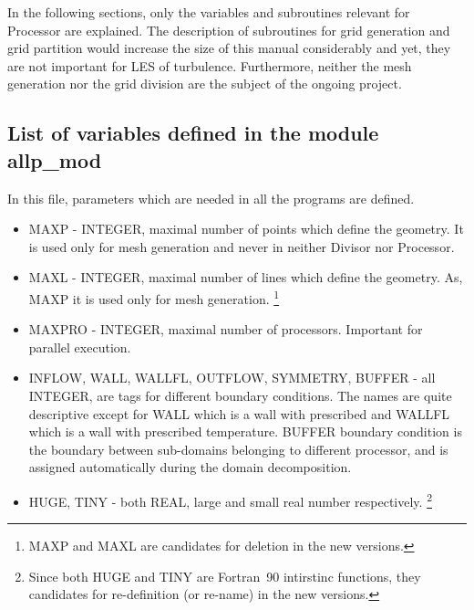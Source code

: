 \documentclass[10pt]{article}
\newcommand*{\tc}{\ttfamily} %
\newcommand*{\tn}{\sffamily} %
\begin{document}
    In the following sections, only the variables and subroutines
    relevant for {\tn Processor} are explained. The description of 
    subroutines for grid generation and grid partition would 
    increase the size of this manual considerably and yet, they
    are not important for LES of turbulence. Furthermore, neither
    the mesh generation nor the grid division are the subject of
    the ongoing project.

    \subsection{List of variables defined in the module {\tc allp\_mod}}

    In this file, parameters which are needed in all the programs
    are defined.

    \begin{itemize}

    \item
    {\tc MAXP} - INTEGER, maximal number of points which define the geometry.
      It is used only for mesh generation and never in neither {\tn Divisor}
      nor {\tn Processor}. 

    \item
    {\tc MAXL} - INTEGER, maximal number of lines which define the geometry.
      As, {\tc MAXP} it is used only for mesh generation.
    \footnote{{\tc MAXP} and {\tc MAXL} are candidates for deletion in
     the new versions.} 

    \item
    {\tc MAXPRO} - INTEGER, maximal number of processors. Important for
      parallel execution.

    \item
    {\tc INFLOW, WALL, WALLFL, OUTFLOW, SYMMETRY, BUFFER} - all INTEGER, are 
      tags for different boundary conditions. The names are quite 
      descriptive except for {\tc WALL} which is a wall with prescribed
      and {\tc WALLFL} which is a wall with prescribed temperature.  
      BUFFER boundary condition is the boundary between
      sub-domains belonging to different processor, and is assigned
      automatically during the domain decomposition.

    \item
    {\tc HUGE, TINY} - both REAL, large and small real number
      respectively.
    \footnote{Since both {\tc HUGE} and {\tc TINY} are Fortran~90 intirstinc
     functions, they candidates for re-definition (or re-name) in the new
     versions.} 

    \end{itemize} 
\end{document}
